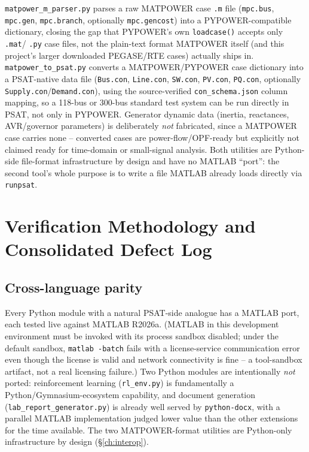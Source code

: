 \documentclass[11pt]{report}
\newcommand{\pkg}[1]{\texttt{#1}}
\theoremstyle{plain}
\theoremstyle{definition}
\theoremstyle{remark}
\begin{document}
\pkg{matpower\_\hspace{0pt}m\_\hspace{0pt}parser.py} parses a raw MATPOWER case \texttt{.m} file
(\texttt{mpc.bus}, \texttt{mpc.gen}, \texttt{mpc.branch}, optionally
\texttt{mpc.gencost}) into a PYPOWER-compatible dictionary, closing the
gap that PYPOWER's own \texttt{loadcase()} accepts only \texttt{.mat}/
\texttt{.py} case files, not the plain-text format MATPOWER itself (and
this project's larger downloaded PEGASE/RTE cases) actually ships in.
\pkg{matpower\_\hspace{0pt}to\_\hspace{0pt}psat.py} converts a MATPOWER/PYPOWER case dictionary
into a PSAT-native data file (\texttt{Bus.con}, \texttt{Line.con},
\texttt{SW.con}, \texttt{PV.con}, \texttt{PQ.con}, optionally
\texttt{Supply.con}/\texttt{Demand.con}), using the source-verified
\pkg{con\_\hspace{0pt}schema.json} column mapping, so a 118-bus or 300-bus standard
test system can be run directly in PSAT, not only in PYPOWER. Generator
dynamic data (inertia, reactances, AVR/governor parameters) is
deliberately \emph{not} fabricated, since a MATPOWER case carries none --
converted cases are power-flow/OPF-ready but explicitly not claimed
ready for time-domain or small-signal analysis. Both utilities are
Python-side file-format infrastructure by design and have no MATLAB
``port'': the second tool's whole purpose is to write a file MATLAB
already loads directly via \texttt{runpsat}.

\chapter{Verification Methodology and Consolidated Defect Log}
\label{ch:verification}

\section{Cross-language parity}

Every Python module with a natural PSAT-side analogue has a MATLAB port,
each tested live against MATLAB R2026a. (MATLAB in this development
environment must be invoked with its process sandbox disabled; under the
default sandbox, \texttt{matlab -batch} fails with a license-service
communication error even though the license is valid and network
connectivity is fine -- a tool-sandbox artifact, not a real licensing
failure.) Two Python modules are intentionally \emph{not} ported:
reinforcement learning (\pkg{rl\_\hspace{0pt}env.py}) is fundamentally a
Python/Gymnasium-ecosystem capability, and document generation
(\pkg{lab\_\hspace{0pt}report\_\hspace{0pt}generator.py}) is already well served by
\pkg{python-docx}, with a parallel MATLAB implementation judged lower
value than the other extensions for the time available. The two
MATPOWER-format utilities are Python-only infrastructure by design
(\S\ref{ch:interop}).
\end{document}
